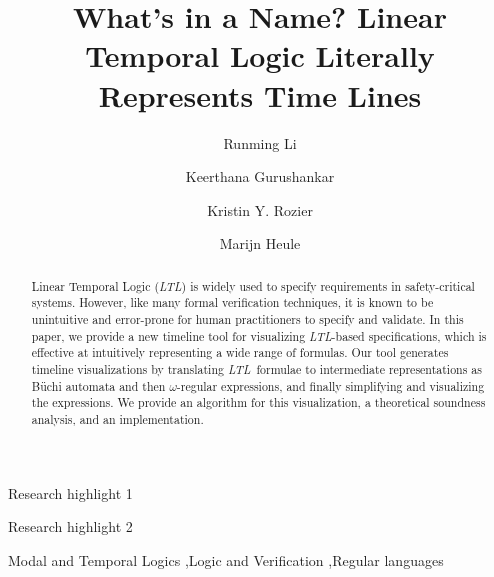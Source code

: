 \documentclass[preprint,12pt]{elsarticle}
\theoremstyle{definition}
\theoremstyle{remark}
\newcommand{\ltl}{\textit{LTL}}
\newcommand{\Buchi}{B\"{u}chi }
\begin{document}
\begin{frontmatter}
    \title{What's in a Name? Linear Temporal Logic Literally Represents Time Lines}

	\author[inst1]{Runming Li}

	\author[inst1]{Keerthana Gurushankar}

    \author[inst2]{Kristin Y. Rozier}

    \author[inst1]{Marijn Heule}




    \begin{abstract}
        Linear Temporal Logic (\ltl) is widely used to specify requirements in safety-critical systems.
        However, like many formal verification techniques, it is known to be unintuitive and error-prone for human practitioners to specify and validate.
        In this paper, we provide a new timeline tool for visualizing \ltl-based specifications, which is effective at intuitively representing a wide range of formulas.
        Our tool generates timeline visualizations by translating \ltl\ formulae to intermediate representations as \Buchi automata and then $\omega$-regular expressions, and finally simplifying and visualizing the expressions.
        We provide an algorithm for this visualization, a theoretical soundness analysis, and an implementation.
    \end{abstract}

    \begin{highlights} %
        \item Research highlight 1
        \item Research highlight 2
    \end{highlights}

    \begin{keyword}
        Modal and Temporal Logics
        \sep Logic and Verification
        \sep Regular languages
    \end{keyword}
\end{frontmatter}
\end{document}
